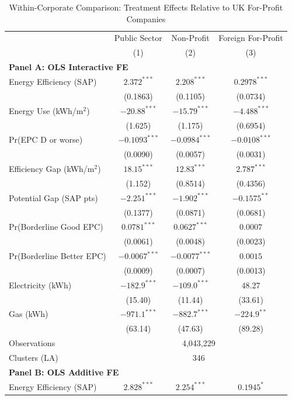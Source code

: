 \begin{table}[htbp]
\centering
\caption{Within-Corporate Comparison: Treatment Effects Relative to UK For-Profit Companies}
\label{tab:within_corporate}
\small
\begin{tabular}{l ccc}
\toprule
 & Public Sector & Non-Profit & Foreign For-Profit \\
 & (1) & (2) & (3) \\
\midrule
\multicolumn{4}{l}{\textbf{Panel A: OLS Interactive FE}} \\
\midrule
Energy Efficiency (SAP) & $2.372^{***}$ & $2.208^{***}$ & $0.2978^{***}$ \\
 & (0.1863) & (0.1105) & (0.0734) \\
Energy Use (kWh/m$^2$) & $-20.88^{***}$ & $-15.79^{***}$ & $-4.488^{***}$ \\
 & (1.625) & (1.175) & (0.6954) \\
Pr(EPC D or worse) & $-0.1093^{***}$ & $-0.0984^{***}$ & $-0.0108^{***}$ \\
 & (0.0090) & (0.0057) & (0.0031) \\
Efficiency Gap (kWh/m$^2$) & $18.15^{***}$ & $12.83^{***}$ & $2.787^{***}$ \\
 & (1.152) & (0.8514) & (0.4356) \\
Potential Gap (SAP pts) & $-2.251^{***}$ & $-1.902^{***}$ & $-0.1575^{**}$ \\
 & (0.1377) & (0.0871) & (0.0681) \\
Pr(Borderline Good EPC) & $0.0781^{***}$ & $0.0627^{***}$ & $0.0007$ \\
 & (0.0061) & (0.0048) & (0.0023) \\
Pr(Borderline Better EPC) & $-0.0067^{***}$ & $-0.0077^{***}$ & $0.0015$ \\
 & (0.0009) & (0.0007) & (0.0013) \\
Electricity (kWh) & $-182.9^{***}$ & $-109.0^{***}$ & $48.27$ \\
 & (15.40) & (11.44) & (33.61) \\
Gas (kWh) & $-971.1^{***}$ & $-882.7^{***}$ & $-224.9^{**}$ \\
 & (63.14) & (47.63) & (89.28) \\
\midrule
Observations & \multicolumn{3}{c}{4,043,229} \\
Clusters (LA) & \multicolumn{3}{c}{346} \\
\midrule
\multicolumn{4}{l}{\textbf{Panel B: OLS Additive FE}} \\
\midrule
Energy Efficiency (SAP) & $2.828^{***}$ & $2.254^{***}$ & $0.1945^{*}$ \\

\end{tabular}
\end{table}

